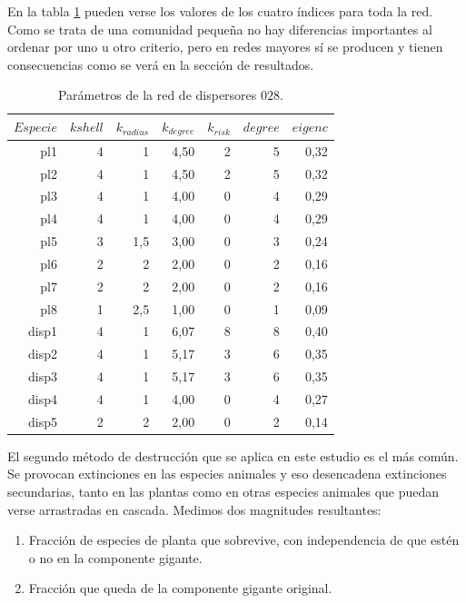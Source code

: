 En la tabla \ref{tab:pars_SD_028} pueden verse los valores de los cuatro índices para toda la red. Como se trata de una comunidad pequeña no hay diferencias importantes
al ordenar por uno u otro criterio, pero en redes mayores sí se producen y tienen consecuencias como se verá en la sección de resultados.


\begin{table}[htbp]
  \centering
  \small
    \begin{tabular}{rrrrrrr}
    \toprule
    $Especie$ & $k shell$ & ${k}_{radius}$ & ${k}_{degree}$ & ${k}_{risk}$ & $degree$ & $eigenc$ \\
\midrule
    pl1  & 4    & 1    & 4,50 & 2    & 5    & 0,32 \\
    pl2  & 4    & 1    & 4,50 & 2    & 5    & 0,32 \\
    pl3  & 4    & 1    & 4,00 & 0    & 4    & 0,29 \\
    pl4  & 4    & 1    & 4,00 & 0    & 4    & 0,29 \\
    pl5  & 3    & 1,5  & 3,00 & 0    & 3    & 0,24 \\
    pl6  & 2    & 2    & 2,00 & 0    & 2    & 0,16 \\
    pl7  & 2    & 2    & 2,00 & 0    & 2    & 0,16 \\
    pl8  & 1    & 2,5  & 1,00 & 0    & 1    & 0,09 \\
    disp1 & 4    & 1    & 6,07 & 8    & 8    & 0,40 \\
    disp2 & 4    & 1    & 5,17 & 3    & 6    & 0,35 \\
    disp3 & 4    & 1    & 5,17 & 3    & 6    & 0,35 \\
    disp4 & 4    & 1    & 4,00 & 0    & 4    & 0,27 \\
    disp5 & 2    & 2    & 2,00 & 0    & 2    & 0,14 \\
    \bottomrule
    \end{tabular}%
    \caption{Parámetros de la red de dispersores $028$.}
  \label{tab:pars_SD_028}%
\end{table}%

El segundo método de destrucción que se aplica en este estudio es el más común. Se provocan extinciones en las especies animales y eso desencadena extinciones secundarias, tanto
en las plantas como en otras especies animales que puedan verse arrastradas en cascada. Medimos dos magnitudes resultantes:

\begin{enumerate}
\item Fracción de especies de planta que sobrevive, con independencia de que estén o no en la componente gigante.
\item Fracción que queda de la componente gigante original.
\end{enumerate}

